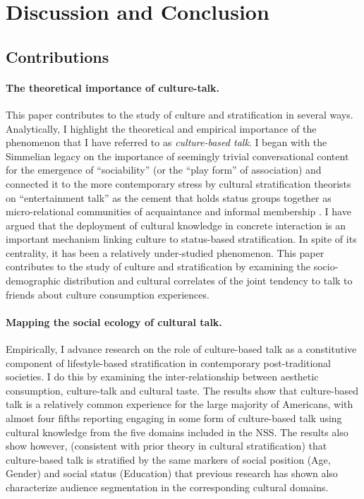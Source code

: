 \documentclass[11pt]{article}
\begin{document}
\section{Discussion and Conclusion}
\subsection{Contributions}
\paragraph{The theoretical importance of culture-talk.}
This paper contributes to the study of culture and stratification in several ways.  Analytically, I highlight the theoretical and empirical importance of the phenomenon that I have referred to as \emph{culture-based talk}. I began with the Simmelian legacy on the importance of seemingly trivial conversational content for the emergence of ``sociability'' (or the ``play form'' of association) and connected it to the more contemporary stress by cultural stratification theorists on ``entertainment talk'' as the cement that holds status groups together as micro-relational communities of acquaintance and informal membership \citep{collins75, dimaggio87, purcell07, lizardo06a}.  I have argued that the deployment of cultural knowledge in concrete interaction is an important mechanism linking culture to status-based stratification.  In spite of its centrality, it has been a relatively under-studied phenomenon. This paper contributes to the study of culture and stratification by examining the socio-demographic distribution and cultural correlates of the joint tendency to talk to friends about culture consumption experiences.  

\paragraph{Mapping the social ecology of cultural talk.}
Empirically, I advance research on the role of culture-based talk as a constitutive component of lifestyle-based stratification in contemporary post-traditional societies.  I do this by examining the inter-relationship between aesthetic consumption, culture-talk and cultural taste. The results show that culture-based talk is a relatively common experience for the large majority of Americans, with almost four fifths reporting engaging in some form of culture-based talk using cultural knowledge from the five domains included in the NSS. The results also show however, (consistent with prior theory in cultural stratification) that culture-based talk is stratified by the same markers of social position (Age, Gender) and social status (Education) that previous research has shown also characterize audience segmentation in the corresponding cultural domains.  
\end{document}
